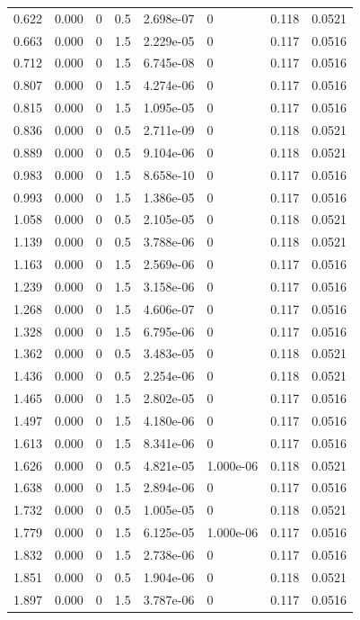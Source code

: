 \documentclass[preview]{standalone}
\begin{document}
{{\begin{tabular}{L{1.2cm}C{1.2cm} C{0.3cm}C{0.5cm} C{1.4cm}C{1.4cm} C{1.4cm}C{1.4cm}}
  0.622  &  0.000  & 0     & 0.5 &  2.698e-07  & 0  & 0.118 &  0.0521   \\ 
  0.663  &  0.000  & 0     & 1.5 &  2.229e-05  & 0  & 0.117 &  0.0516   \\ 
  0.712  &  0.000  & 0     & 1.5 &  6.745e-08  & 0  & 0.117 &  0.0516   \\ 
  0.807  &  0.000  & 0     & 1.5 &  4.274e-06  & 0  & 0.117 &  0.0516   \\ 
  0.815  &  0.000  & 0     & 1.5 &  1.095e-05  & 0  & 0.117 &  0.0516   \\ 
  0.836  &  0.000  & 0     & 0.5 &  2.711e-09  & 0  & 0.118 &  0.0521   \\ 
  0.889  &  0.000  & 0     & 0.5 &  9.104e-06  & 0  & 0.118 &  0.0521   \\ 
  0.983  &  0.000  & 0     & 1.5 &  8.658e-10  & 0  & 0.117 &  0.0516   \\ 
  0.993  &  0.000  & 0     & 1.5 &  1.386e-05  & 0  & 0.117 &  0.0516   \\ 
  1.058  &  0.000  & 0     & 0.5 &  2.105e-05  & 0  & 0.118 &  0.0521   \\ 
  1.139  &  0.000  & 0     & 0.5 &  3.788e-06  & 0  & 0.118 &  0.0521   \\ 
  1.163  &  0.000  & 0     & 1.5 &  2.569e-06  & 0  & 0.117 &  0.0516   \\ 
  1.239  &  0.000  & 0     & 1.5 &  3.158e-06  & 0  & 0.117 &  0.0516   \\ 
  1.268  &  0.000  & 0     & 1.5 &  4.606e-07  & 0  & 0.117 &  0.0516   \\ 
  1.328  &  0.000  & 0     & 1.5 &  6.795e-06  & 0  & 0.117 &  0.0516   \\ 
  1.362  &  0.000  & 0     & 0.5 &  3.483e-05  & 0  & 0.118 &  0.0521   \\ 
  1.436  &  0.000  & 0     & 0.5 &  2.254e-06  & 0  & 0.118 &  0.0521   \\ 
  1.465  &  0.000  & 0     & 1.5 &  2.802e-05  & 0  & 0.117 &  0.0516   \\ 
  1.497  &  0.000  & 0     & 1.5 &  4.180e-06  & 0  & 0.117 &  0.0516   \\ 
  1.613  &  0.000  & 0     & 1.5 &  8.341e-06  & 0  & 0.117 &  0.0516   \\ 
  1.626  &  0.000  & 0     & 0.5 &  4.821e-05  & 1.000e-06  & 0.118 &  0.0521   \\ 
  1.638  &  0.000  & 0     & 1.5 &  2.894e-06  & 0  & 0.117 &  0.0516   \\ 
  1.732  &  0.000  & 0     & 0.5 &  1.005e-05  & 0  & 0.118 &  0.0521   \\ 
  1.779  &  0.000  & 0     & 1.5 &  6.125e-05  & 1.000e-06  & 0.117 &  0.0516   \\ 
  1.832  &  0.000  & 0     & 1.5 &  2.738e-06  & 0  & 0.117 &  0.0516   \\ 
  1.851  &  0.000  & 0     & 0.5 &  1.904e-06  & 0  & 0.118 &  0.0521   \\ 
  1.897  &  0.000  & 0     & 1.5 &  3.787e-06  & 0  & 0.117 &  0.0516   \\ 
\hline 
\end{tabular} 

}}
\end{document}
